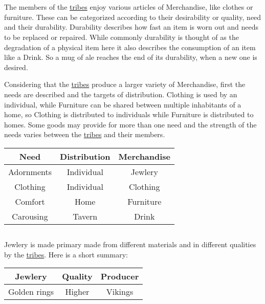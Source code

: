 \section{}\label{ch:Goods:Merchandise}

The members of the \hyperref[ch:Tribes]{tribes} enjoy various articles of
\gls*{Merchandise}, like clothes or furniture. These can be categorized
according to their desirability or quality, need and their durability.
Durability describes how fast an item is worn out and needs to be replaced or
repaired. While commonly durability is thought of as the degradation of a
physical item here it also describes the consumption of an item like a
\gls{Drink}. So a mug of ale reaches the end of its durability, when a new one
is desired.

Considering that the \hyperref[ch:Tribes]{tribes} produce a larger variety of
\gls*{Merchandise}, first the needs are described and the targets of
distribution. \Gls{Clothing} is used by an individual, while \gls{Furniture}
can be shared between multiple inhabitants of a home, so \Gls{Clothing} is
distributed to individuals while \gls{Furniture} is distributed to homes. Some
goods may provide for more than one need and the strength of the needs varies
between the \hyperref[ch:Tribes]{tribes} and their members.

\begin{longtable}{ccc}
	\toprule
	Need       & Distribution & \Gls{Merchandise} \\
	\midrule
	Adornments & Individual   & \Gls{Jewlery}     \\
	Clothing   & Individual   & \Gls{Clothing}    \\
	Comfort    & Home         & \Gls{Furniture}   \\
	Carousing  & Tavern       & \Gls{Drink}       \\
	\bottomrule
\end{longtable}

\subsection{}\label{ch:Goods:Merchandise:Jewlery}

\Gls{Jewlery} is made primary made from different materials and in different qualities by the
\hyperref[ch:Tribes]{tribes}. Here is a short summary:

\begin{longtable}{ccc}
	\toprule
	\Gls*{Jewlery} & Quality & Producer      \\
	\midrule
	Golden rings   & Higher  & \Gls{Vikings} \\ \bottomrule
\end{longtable}

